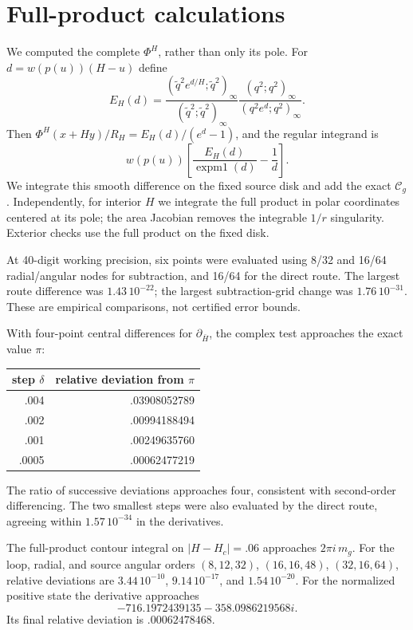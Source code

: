 \documentclass[11pt,a4paper]{article}
\begin{document}
\newpage
\section{Full-product calculations}
We computed the complete $\Phi^H$, rather than only its pole.
For $d=w(p(u))(H-u)$ define
\[
 E_H(d)=
 \frac{(\widetilde q^2e^{d/H};\widetilde q^2)_\infty}
      {(\widetilde q^2;\widetilde q^2)_\infty}
 \frac{(q^2;q^2)_\infty}{(q^2e^d;q^2)_\infty}.
\]
Then $\Phi^H(x+Hy)/R_H=E_H(d)/(e^d-1)$, and the regular integrand is
\[
 w(p(u))\left[\frac{E_H(d)}{\operatorname{expm1}(d)}-\frac1d\right].
\]
We integrate this smooth difference on the fixed source disk and add
the exact $\mathcal C_g$. Independently, for interior $H$ we integrate
the full product in polar coordinates centered at its pole; the area
Jacobian removes the integrable $1/r$ singularity. Exterior checks
use the full product on the fixed disk.

At 40-digit working precision, six points were evaluated using
8/32 and 16/64 radial/angular nodes for subtraction, and 16/64 for
the direct route. The largest route difference was $1.43\,10^{-22}$;
the largest subtraction-grid change was $1.76\,10^{-31}$.
These are empirical comparisons, not certified error bounds.

With four-point central differences for $\partial_{\bar H}$,
the complex test approaches the exact value $\pi$:
\begin{center}
\begin{tabular}{rr}
\toprule
step $\delta$ & relative deviation from $\pi$\\
\midrule
.004 & .03908052789\\
.002 & .00994188494\\
.001 & .00249635760\\
.0005& .00062477219\\
\bottomrule
\end{tabular}
\end{center}
The ratio of successive deviations approaches four, consistent with
second-order differencing. The two smallest steps were also evaluated
by the direct route, agreeing within $1.57\,10^{-34}$ in the derivatives.

The full-product contour integral on $|H-H_c|=.06$ approaches
$2\pi i\,m_g$. For the loop, radial, and source angular orders
$(8,12,32)$, $(16,16,48)$, $(32,16,64)$, relative deviations are
$3.44\,10^{-10}$, $9.14\,10^{-17}$, and $1.54\,10^{-20}$.
For the normalized positive state the derivative approaches
\[
-716.1972439135-358.0986219568i.
\]
Its final relative deviation is $.00062478468$.
\end{document}
